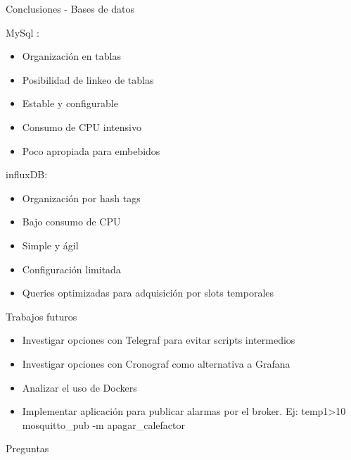 \documentclass[aspectratio= 43]{beamer}
\begin{document}
\begin{frame}{Conclusiones - Bases de datos}
      \begin{multicols}{2}
	MySql :
	\begin{itemize}
            \item Organización en tablas
            \item Posibilidad de linkeo de tablas
            \item Estable y configurable
            \item Consumo de CPU intensivo
            \item Poco apropiada para embebidos
	\end{itemize}

	\columnbreak

	influxDB:
	\begin{itemize}
            \item Organización por hash tags
            \item Bajo consumo de CPU
            \item Simple y ágil
            \item Configuración limitada
            \item Queries optimizadas para adquisición por slots temporales
	\end{itemize}
      \end{multicols} 
  \end{frame}

\begin{frame}{Trabajos futuros}
      \begin{itemize}
	    \item Investigar opciones con Telegraf para evitar scripts intermedios
	    \item Investigar opciones con Cronograf como alternativa a Grafana
	    \item Analizar el uso de Dockers
	    \item Implementar aplicación para publicar alarmas por el broker. Ej: temp1>10 mosquitto\_pub -m apagar\_calefactor 
	\end{itemize}
\end{frame}


  \begin{frame}{Preguntas}
  \end{frame}
\end{document}
